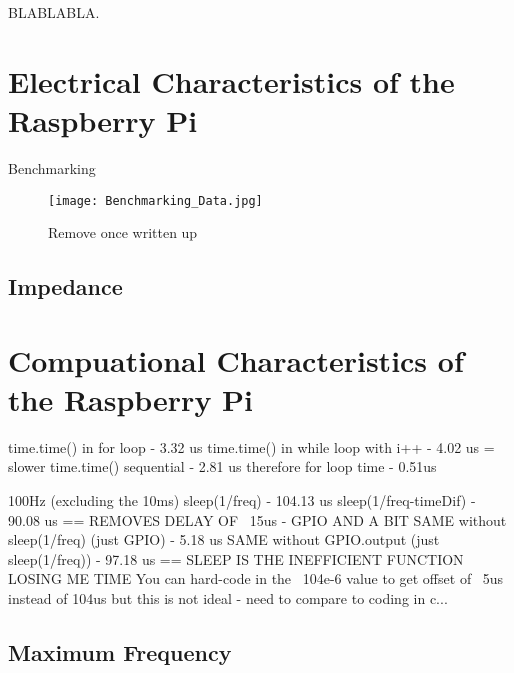 \documentclass[../main.tex]{subfiles}
\begin{document}
BLABLABLA.


\section{Electrical Characteristics of the Raspberry Pi}

Benchmarking

\begin{figure}[ht]
	\centering
	\texttt{[image: Benchmarking\_Data.jpg]}
	\caption{Remove once written up}
\end{figure}


\subsection{Impedance}


\section{Compuational Characteristics of the Raspberry Pi} \label{sec_Computation}

time.time() in for loop - 3.32 us
time.time() in while loop with i++ - 4.02 us = slower
time.time() sequential - 2.81 us
therefore for loop time - 0.51us

100Hz (excluding the 10ms)
sleep(1/freq) - 104.13 us
sleep(1/freq-timeDif) - 90.08 us == REMOVES DELAY OF ~15us - GPIO AND A BIT
SAME without sleep(1/freq) (just GPIO) - 5.18 us
SAME without GPIO.output (just sleep(1/freq)) - 97.18 us == SLEEP IS THE INEFFICIENT FUNCTION LOSING ME TIME
You can hard-code in the ~104e-6 value to get offset of ~5us instead of 104us but this is not ideal - need to compare to coding in c...

\subsection{Maximum Frequency}

\end{document}
